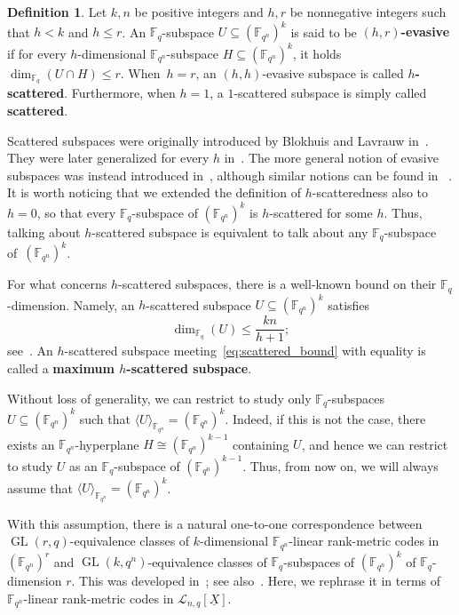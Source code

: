 \documentclass[11pt]{article}
\theoremstyle{definition}
\newtheorem{defi}[theo]{Definition}
\numberwithin{equation}{section}
\DeclareMathOperator{\GL}{GL}
\begin{document}
 \begin{defi}
Let $k,n$ be positive integers and $h,r$ be nonnegative integers such that $h<k$ and $h \le r$. An $\mathbb{F}_q$-subspace $U\subseteq (\mathbb{F}_{q^n})^k$ is said to be \textbf{$(h,r)$-evasive} if for every $h$-dimensional ${\mathbb F}_{q^n}$-subspace  $H\subseteq (\mathbb{F}_{q^n})^k$, it holds $\dim_{\mathbb{F}_q}(U\cap H)\leq r$. When~$h=r$, an  $(h,h)$-evasive subspace is called \textbf{$h$-scattered}. Furthermore, when $h=1$,  a $1$-scattered subspace is simply called \textbf{scattered}.
\end{defi}

Scattered subspaces were originally introduced by Blokhuis and Lavrauw in~\cite{blokhuis2000scattered}. They were later generalized for every $h$ in~\cite{csajbok2021generalising}. The more general notion of evasive subspaces was instead introduced in~\cite{bartoli2021evasive}, although similar notions can be found in ~\cite{pudlak2004pseudorandom,guruswami2011linear,dvir2012subspace,guruswami2016explicit}. 
It is worth noticing that we extended the definition of $h$-scatteredness also to $h=0$, so that every $\mathbb{F}_q$-subspace of $(\mathbb{F}_{q^n})^k$ is $h$-scattered for some $h$. Thus,  talking about $h$-scattered subspace is equivalent to talk about any $\mathbb{F}_q$-subspace of~$(\mathbb{F}_{q^n})^k$.

For what concerns $h$-scattered subspaces, there is a well-known bound on their $\mathbb{F}_q$-dimension. Namely, an $h$-scattered subspace $U\subseteq (\mathbb{F}_{q^n})^k$ satisfies
\begin{equation}\label{eq:scattered_bound}\dim_{\mathbb{F}_q}(U)\leq \frac{kn}{h+1};\end{equation}
see~\cite{blokhuis2000scattered,csajbok2021generalising}. An $h$-scattered subspace meeting~\eqref{eq:scattered_bound} with equality is called a \textbf{maximum $h$-scattered subspace}.

Without loss of generality, we can restrict to study only $\mathbb{F}_q$-subspaces $U\subseteq (\mathbb{F}_{q^n})^k$ such that $\langle U\rangle_{{\mathbb F}_{q^n}}=(\mathbb{F}_{q^n})^k$. Indeed, if this is not the case, there exists an ${\mathbb F}_{q^n}$-hyperplane $H\cong (\mathbb{F}_{q^n})^{k-1}$ containing $U$, and hence we can restrict to study $U$ as an $\mathbb{F}_q$-subspace of $(\mathbb{F}_{q^n})^{k-1}$. Thus, from now on, we will always assume that $\langle U \rangle_{{\mathbb F}_{q^n}}=(\mathbb{F}_{q^n})^k$.

With this assumption,  there is a natural one-to-one correspondence between $\GL(r,q)$-equivalence classes of
$k$-dimensional ${\mathbb F}_{q^n}$-linear rank-metric codes in $(\mathbb{F}_{q^n})^{r}$ and $\GL(k,q^n)$-equivalence classes of $\mathbb{F}_q$-subspaces of $(\mathbb{F}_{q^n})^k$ of $\mathbb{F}_q$-dimension $r$. This was developed in~\cite{randrianarisoa2020geometric}; see also~\cite{ABNR22}. Here, we rephrase it in terms of ${\mathbb F}_{q^n}$-linear rank-metric codes  in $\mathcal{L}_{n,q}[\underline{X}]$. 
\end{document}

